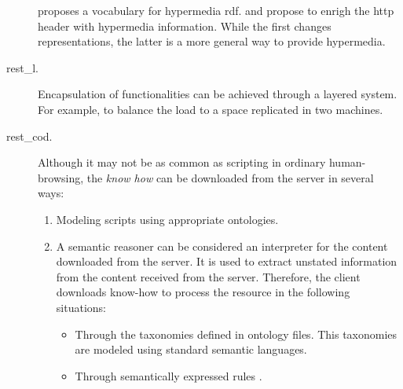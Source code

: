 \begin{description}
				  \citet{kjernsmo_necessity_2012} proposes a vocabulary for hypermedia \ac{rdf}.
				  \citet{steiner_fulfilling_2011} and \citet{verborgh_functional_2012} propose to enrigh the \ac{http} header with hypermedia information.
				  While the first changes representations, the latter is a more general way to provide hypermedia.
 \item[\ac{rest_l}.] Encapsulation of functionalities can be achieved through a layered system.
                     For example, to balance the load to a space replicated in two machines.
 \item[\ac{rest_cod}.] Although it may not be as common as scripting in ordinary human-browsing, %
            the \emph{know how} can be downloaded from the server in several ways:
            \begin{enumerate}
	      \item Modeling scripts using appropriate ontologies. %
	      \item A semantic reasoner can be considered an interpreter for the content downloaded from the server.
	            It is used to extract unstated information from the content received from the server.
	            Therefore, the client downloads know-how to process the resource in the following situations:
		    \begin{itemize}
		      \item Through the taxonomies defined in ontology files. %
		            This taxonomies are modeled using standard semantic languages. %
		      \item Through semantically expressed rules \citep{berners-lee_n3logic:_2008}. %
		    \end{itemize}
            \end{enumerate}
\end{description}



